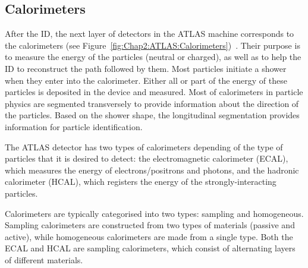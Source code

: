 \subsection{Calorimeters}
\label{sec:Chap2:CALO}
After the ID, the next layer of detectors in the ATLAS machine corresponds to the calorimeters (see Figure~\ref{fig:Chap2:ATLAS:Calorimeters})~\cite{Cavallari_2011}. 
Their purpose is to measure the energy of the particles 
(neutral or charged), as well as to help the ID to reconstruct the path followed by them. 
Most particles initiate a shower when they enter into the calorimeter. 
Either all or part of the energy 
of these particles is deposited in the device and measured.
Most of calorimeters in particle physics are segmented transversely to provide information about the direction of the particles.
Based on the shower shape, the longitudinal segmentation provides information for particle identification.

The ATLAS detector has two types of calorimeters depending of the type of particles that it is desired to detect: 
the electromagnetic calorimeter (ECAL), which measures the energy of electrons/positrons and photons, 
and the hadronic calorimeter (HCAL), which registers the energy of the strongly-interacting particles. 

Calorimeters are typically categorised into two types: sampling and homogeneous. 
Sampling calorimeters are constructed from two types of materials (passive and active), 
while homogeneous calorimeters are made from a single type. 
Both the ECAL and HCAL are sampling calorimeters, which consist of alternating layers of different materials.


